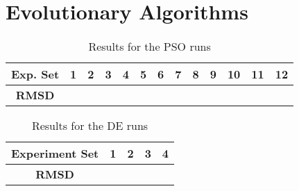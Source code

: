 \section{Evolutionary Algorithms}

\begin{table}
	\label{table:ea-pso-results}
	\centering
	\begin{tabular}{ | >{\bfseries}c | c | c | c | c | c | c | c | c | c | c | c | c | }
		\hline
		Exp. Set & 1 & 2 & 3 & 4 & 5 & 6 & 7 & 8 & 9 & 10 & 11 & 12 \\ \hline
		RMSD &  &  &  &  &  &  &  &  &  &  &  &  \\ \hline
	\end{tabular}
	\caption{Results for the PSO runs}
\end{table}

\begin{table}
	\label{table:ea-de-results}
	\centering
	\begin{tabular}{ | >{\bfseries}c | c | c | c | c | }
		\hline
		Experiment Set & 1 & 2 & 3 & 4 \\ \hline
		RMSD &  &  &  &  \\ \hline
	\end{tabular}
	\caption{Results for the DE runs}
\end{table}